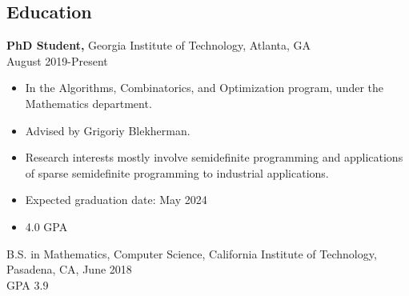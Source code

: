 \documentclass[margin]{res}
\begin{document}
 
 

 
\address{{\bf Present Address} \\ 1000 Northside Dr NW\; Apt 1314  \\ Atlanta, GA 30318  \\
        (626) 399-3716\\kshu8@gatech.edu }

 
\begin{resume} 

\section{Education} 
 {\bf PhD Student,} Georgia Institute of Technology, Atlanta, GA\\ August 2019-Present
 \begin{itemize} \itemsep -2pt  %
 \item In the Algorithms, Combinatorics, and Optimization program, under the Mathematics department.
 \item Advised by Grigoriy Blekherman.
 \item Research interests mostly involve semidefinite programming and applications of sparse semidefinite programming to industrial applications.
 \item Expected graduation date: May 2024
 \item 4.0 GPA
 \end{itemize}

B.S. in Mathematics, Computer Science, California Institute of Technology, Pasadena, CA, June 2018 \\
GPA 3.9


\end{resume}
\end{document}
